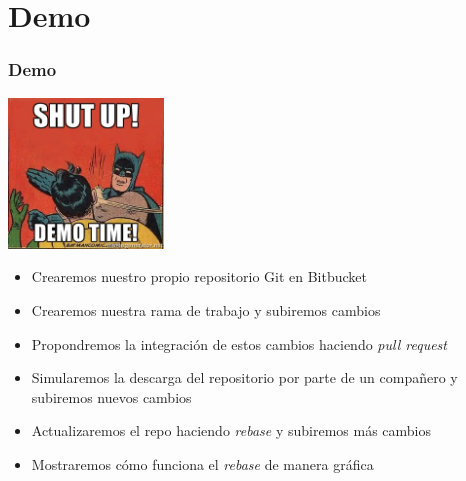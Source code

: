 \section{Demo}
\frame
{
\frametitle{Demo}
\begin{center}
 \includegraphics[height=4cm]{imgs/demo-time.jpg}
\end{center}

\begin{itemize}
 \item Crearemos nuestro propio repositorio Git en Bitbucket
 \item Crearemos nuestra rama de trabajo y subiremos cambios
 \item Propondremos la integración de estos cambios haciendo \textit{pull request}
 \item Simularemos la descarga del repositorio por parte de un compañero y subiremos nuevos cambios
 \item Actualizaremos el repo haciendo \textit{rebase} y subiremos más cambios
 \item Mostraremos cómo funciona el \textit{rebase} de manera gráfica
\end{itemize}
}
